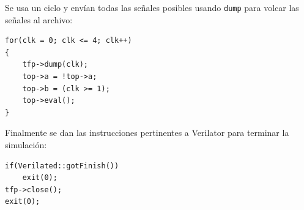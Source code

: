 \documentclass[11pt]{/home/hao/dev/org/latex-plantilla/IEEEtran}
\begin{document}
Se usa un ciclo y envían todas las señales posibles usando
\texttt{dump} para volcar las señales al archivo:

\begin{verbatim}
for(clk = 0; clk <= 4; clk++)
{
    tfp->dump(clk);
    top->a = !top->a;
    top->b = (clk >= 1);
    top->eval();
}
\end{verbatim}

Finalmente se dan las instrucciones pertinentes a Verilator para
terminar la simulación:

\begin{verbatim}
if(Verilated::gotFinish())
    exit(0);
tfp->close();
exit(0);
\end{verbatim}



\end{document}
